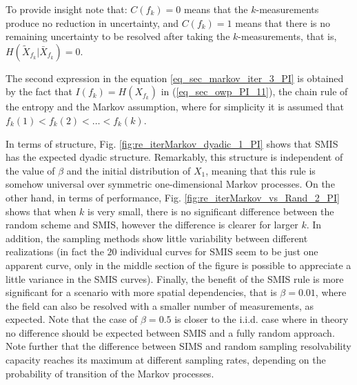 {To provide insight note that: $C(f_k)=0$ means that the $k$-measurements produce no reduction in uncertainty, and $C(f_k)=1$ means that there is no remaining uncertainty to be resolved after taking the $k$-measurements, that is, $H(\tilde{X}_{f_k}|\bar{X}_{f_k})=0$.}

The second expression in the equation \eqref{eq_sec_markov_iter_3_PI} is obtained by the fact that $I(f_k)=H(X_{f_k})$ in (\ref{eq_sec_owp_PI_11}), the chain rule of the entropy \citep{cover_2006} and the Markov assumption, where for simplicity it is assumed that $f_k(1) <f_k(2)<\ldots< f_k(k)$.

In terms of structure,  Fig. \ref{fig:re_iterMarkov_dyadic_1_PI} shows that SMIS has the expected dyadic structure. Remarkably,  this structure is independent of the value of $\beta$ and the initial distribution of $X_1$, meaning that this rule is somehow universal over symmetric one-dimensional Markov processes. On the other hand, in terms of performance, Fig. \ref{fig:re_iterMarkov_vs_Rand_2_PI} shows that when $k$ is very small, there is no significant difference between the random scheme and SMIS, however the difference is clearer for larger $k$. In addition, the sampling methods show little variability between different realizations (in fact the $20$ individual curves for SMIS seem to be just one apparent curve, only in the middle section of the figure is possible to appreciate a little variance in the SMIS curves). Finally, the benefit of the SMIS rule is more significant for a scenario with more spatial dependencies, that is $\beta=0.01$, where the field can also be resolved with a smaller number of measurements, as expected. Note that the case of $\beta=0.5$ is closer to the i.i.d. case where in theory no difference should be expected between SMIS and a fully random approach. {Note further that the difference between SIMS and random sampling resolvability capacity reaches its maximum at different sampling rates, depending on the probability of transition of the Markov processes.}

